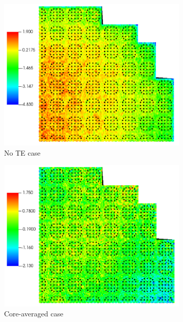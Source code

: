 \begin{figure}
    \centering
    \begin{subfigure}[b]{0.5\textwidth}
        \centering
        \includegraphics[width=\textwidth]{figs/pin_error_no_exp.pdf}
        \caption{No TE case}
    \end{subfigure}
    \begin{subfigure}[b]{0.5\textwidth}
        \centering
        \includegraphics[width=\textwidth]{figs/pin_error_nominal.pdf}
        \caption{Core-averaged case}
    \end{subfigure}
    \begin{subfigure}[b]{0.5\textwidth}

\end{subfigure}
\end{figure}
